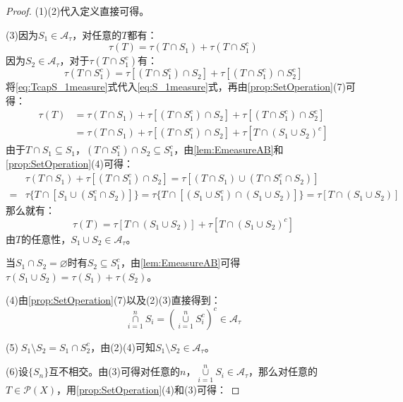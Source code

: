 \begin{proof}
	(1)(2)代入定义直接可得。\par
	(3)因为$S_1\in\mathscr{A}_{\tau}$，对任意的$T$都有：
	\begin{equation}\label{eq:S_1measure}
		\tau(T)=\tau(T\cap S_1)+\tau(T\cap S_1^c)
	\end{equation}
	因为$S_2\in\mathscr{A}_{\tau}$，对于$\tau(T\cap S_1^c)$有：
	\begin{equation}\label{eq:TcapS_1measure}
		\tau(T\cap S_1^c)=\tau[(T\cap S_1^c)\cap S_2]+\tau[(T\cap S_1^c)\cap S_2^c]
	\end{equation}
	将\eqref{eq:TcapS_1measure}式代入\eqref{eq:S_1measure}式，再由\cref{prop:SetOperation}(7)可得：
	\begin{align*}
		\tau(T)&=\tau(T\cap S_1)+\tau[(T\cap S_1^c)\cap S_2]+\tau[(T\cap S_1^c)\cap S_2^c] \\
		&=\tau(T\cap S_1)+\tau[(T\cap S_1^c)\cap S_2]+\tau[T\cap(S_1\cup S_2)^c]
	\end{align*}
	由于$T\cap S_1\subseteq S_1$，$(T\cap S_1^c)\cap S_2\subseteq S_1^c$，由\cref{lem:EmeasureAB}和\cref{prop:SetOperation}(4)可得：
	\begin{align*}
		&\tau(T\cap S_1)+\tau[(T\cap S_1^c)\cap S_2]=\tau[(T\cap S_1)\cup(T\cap S_1^c\cap S_2)] \\
		=&\tau\{T\cap[S_1\cup(S_1^c\cap S_2)]\}=\tau\{T\cap[(S_1\cup S_1^c)\cap(S_1\cup S_2)]\}=\tau[T\cap(S_1\cup S_2)]
	\end{align*}
	那么就有：
	\begin{equation*}
		\tau(T)=\tau[T\cap(S_1\cup S_2)]+\tau[T\cap(S_1\cup S_2)^c]
	\end{equation*}
	由$T$的任意性，$S_1\cup S_2\in\mathscr{A}_{\tau}$。\par
	当$S_1\cap S_2=\varnothing$时有$S_2\subseteq S_1^c$，由\cref{lem:EmeasureAB}可得$\tau(S_1\cup S_2)=\tau(S_1)+\tau(S_2)$。\par
	(4)由\cref{prop:SetOperation}(7)以及(2)(3)直接得到：
	\begin{equation*}
		\underset{i=1}{\overset{n}{\cap}}S_i=\left(\underset{i=1}{\overset{n}{\cup}}S_i^c\right)^c\in\mathscr{A}_{\tau}
	\end{equation*}\par
	(5)$\;S_1\setminus S_2=S_1\cap S_2^c$，由(2)(4)可知$S_1\setminus S_2\in\mathscr{A}_{\tau}$。\par
	(6)设$\{S_n\}$互不相交。由(3)可得对任意的$n$，$\underset{i=1}{\overset{n}{\cup}}S_i\in\mathscr{A}_{\tau}$，那么对任意的$T\in\mathscr{P}(X)$，用\cref{prop:SetOperation}(4)和(3)可得：

\end{proof}
